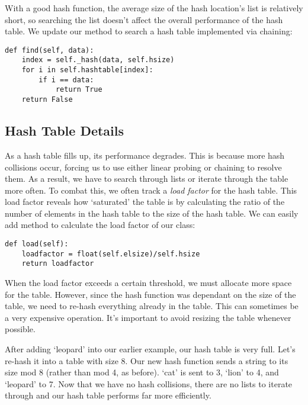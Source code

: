 With a good hash function, the average size of the hash location's list is relatively short, so searching the list doesn't affect the overall performance of the hash table.
We update our  method to search a hash table implemented via chaining:
\begin{lstlisting}
def find(self, data):
    index = self._hash(data, self.hsize)
    for i in self.hashtable[index]:
        if i == data:
            return True
    return False
\end{lstlisting}

\subsection*{Hash Table Details}
As a hash table fills up, its performance degrades.
This is because more hash collisions occur, forcing us to use either linear probing or chaining to resolve them.
As a result, we have to search through lists or iterate through the table more often.
To combat this, we often track a \emph{load factor} for the hash table.
This load factor reveals how `saturated' the table is by calculating the ratio of the number of elements in the hash table to the size of the hash table.
We can easily add method to calculate the load factor of our  class:
\begin{lstlisting}
def load(self):
    loadfactor = float(self.elsize)/self.hsize
    return loadfactor
\end{lstlisting}

When the load factor exceeds a certain threshold, we must allocate more space for the table.
However, since the hash function was dependant on the size of the table, we need to re-hash everything already in the table.
This can sometimes be a very expensive operation.
It's important to avoid resizing the table whenever possible.

After adding `leopard' into our earlier example, our hash table is very full. Let's re-hash it into a table with size 8.
Our new hash function sends a string to its size mod 8 (rather than mod 4, as before).
`cat' is sent to 3, `lion' to 4, and `leopard' to 7.
Now that we have no hash collisions, there are no lists to iterate through and our hash table performs far more efficiently.
\begin{figure}
\end{figure}


